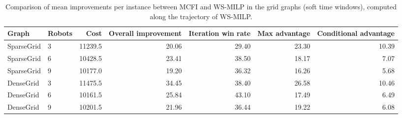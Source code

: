 {\color{red}
\begin{table}[htb]
\caption{Comparison of mean improvements per instance between MCFI and WS-MILP in the grid graphs (soft time windows), computed along the trajectory of WS-MILP.}
\label{tab:mean_improvements}
\resizebox{\textwidth}{!} {
\begin{tabular}{llrrrrr}
\toprule
Graph & Robots & Cost & Overall improvement & Iteration win rate & Max advantage & Conditional advantage \\
\midrule
SparseGrid & 3 & 11239.5 & 20.06 & 29.40 & 23.30 & 10.39 \\
SparseGrid & 6 & 10428.5 & 23.41 & 38.50 & 18.17 & 7.07 \\
SparseGrid & 9 & 10177.0 & 19.20 & 36.32 & 16.26 & 5.68 \\
DenseGrid & 3 & 11475.5 & 34.45 & 38.40 & 26.58 & 10.46 \\
DenseGrid & 6 & 10161.5 & 25.84 & 43.10 & 17.49 & 6.49 \\
DenseGrid & 9 & 10201.5 & 21.96 & 36.44 & 19.22 & 6.08 \\
\bottomrule
\end{tabular}
}
\end{table}
}
